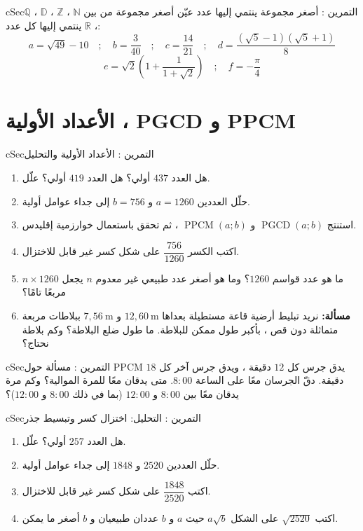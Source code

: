\documentclass[12pt,a4paper]{article}
\newenvironment{BOX}[2]{\begin{otherlanguage}{english}\begin{arbox}{#1}{#2}}{\end{arbox}\end{otherlanguage}}
\newcounter{exo}
\newenvironment{tamrin}[1]{\stepcounter{exo}\begin{BOX}{cSec}{التمرين \theexo: #1}}{\end{BOX}}
\newcommand{\N}{\mathbb{N}}
\newcommand{\Z}{\mathbb{Z}}
\newcommand{\D}{\mathbb{D}}
\newcommand{\Q}{\mathbb{Q}}
\newcommand{\R}{\mathbb{R}}
\newcommand{\pgcd}{\operatorname{PGCD}}
\newcommand{\ppcm}{\operatorname{PPCM}}
\begin{document}
\begin{tamrin}{أصغر مجموعة ينتمي إليها عدد}
عيّن أصغر مجموعة من بين $\N$ ، $\Z$ ، $\D$ ، $\Q$ ، $\R$ ينتمي إليها كل عدد:
\[a=\sqrt{49}-10\quad;\quad b=\frac3{40}\quad;\quad c=\frac{14}{21}\quad;\quad d=\frac{\left(\sqrt5-1\right)\left(\sqrt5+1\right)}8\]
\[e=\sqrt2\left(1+\frac1{1+\sqrt2}\right)\quad;\quad f=-\frac\pi4\]
\end{tamrin}

\section{الأعداد الأولية ، PGCD و PPCM}
\begin{tamrin}{الأعداد الأولية والتحليل}
\begin{enumerate}
\item هل العدد $437$ أولي؟ هل العدد $419$ أولي؟ علّل.
\item حلّل العددين $a=1260$ و $b=756$ إلى جداء عوامل أولية.
\item استنتج $\pgcd(a;b)$ و $\ppcm(a;b)$ ، ثم تحقق باستعمال خوارزمية إقليدس.
\item اكتب الكسر $\dfrac{756}{1260}$ على شكل كسر غير قابل للاختزال.
\item ما هو عدد قواسم $1260$؟ وما هو أصغر عدد طبيعي غير معدوم $n$ يجعل $n\times1260$ مربعًا تامًا؟
\item \textbf{مسألة:} نريد تبليط أرضية قاعة مستطيلة بعداها $12{,}60\ \text{m}$ و $7{,}56\ \text{m}$ ببلاطات مربعة متماثلة دون قص ، بأكبر طول ممكن للبلاطة. ما طول ضلع البلاطة؟ وكم بلاطة نحتاج؟
\end{enumerate}
\end{tamrin}

\begin{tamrin}{مسألة حول PPCM}
يدق جرس كل $12$ دقيقة ، ويدق جرس آخر كل $18$ دقيقة. دقّ الجرسان معًا على الساعة $8{:}00$. متى يدقان معًا للمرة الموالية؟ وكم مرة يدقان معًا بين $8{:}00$ و $12{:}00$ (بما في ذلك $8{:}00$ و $12{:}00$)؟
\end{tamrin}

\begin{tamrin}{التحليل: اختزال كسر وتبسيط جذر}
\begin{enumerate}
\item هل العدد $257$ أولي؟ علّل.
\item حلّل العددين $2520$ و $1848$ إلى جداء عوامل أولية.
\item اكتب $\dfrac{1848}{2520}$ على شكل كسر غير قابل للاختزال.
\item اكتب $\sqrt{2520}$ على الشكل $a\sqrt b$ حيث $a$ و $b$ عددان طبيعيان و $b$ أصغر ما يمكن.
\end{enumerate}
\end{tamrin}
\end{document}
